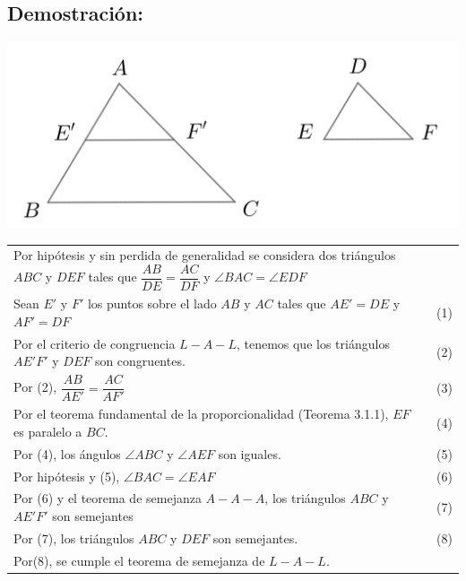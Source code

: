 \documentclass[12pt,a4paper]{article}
\begin{document}
\subsection*{Demostración:} 
\begin{center}
\includegraphics[scale=0.8]{Imagenes/semejanza.png} 
\end{center}
\begin{tabular}{p{15.9cm} p{1cm}}
Por hipótesis y sin perdida de generalidad se considera dos triángulos $ABC$ y $DEF$ tales que $\dfrac{AB}{DE}=\dfrac{AC}{DF}$ y $\angle BAC=\angle EDF$
\\Sean $E'$ y $F'$ los puntos sobre el lado $AB$ y $AC$ tales que $AE'=DE$ y $AF'=DF$& (1)
\\Por el criterio de congruencia $L-A-L$, tenemos que los triángulos $AE'F'$ y $DEF$ son congruentes. &\medskip(2)
\\Por (2), $\dfrac{AB}{AE'}=\dfrac{AC}{AF'}$ &(3)
\\Por el teorema fundamental de la proporcionalidad (Teorema 3.1.1), $EF$ es paralelo a $BC$. &(4) 
\\Por (4), los ángulos $\angle ABC$ y $\angle AEF$ son iguales. &(5)
\\Por hipótesis y (5), $\angle BAC= \angle EAF$&(6)
\\Por (6) y el teorema de semejanza $A-A-A$, los triángulos $ABC$ y $AE'F'$ son semejantes&(7)
\\Por (7), los triángulos $ABC$ y $DEF$ son semejantes. &(8)
\\Por(8), se cumple el teorema de semejanza de $L-A-L$.
\end{tabular}
\end{document}
